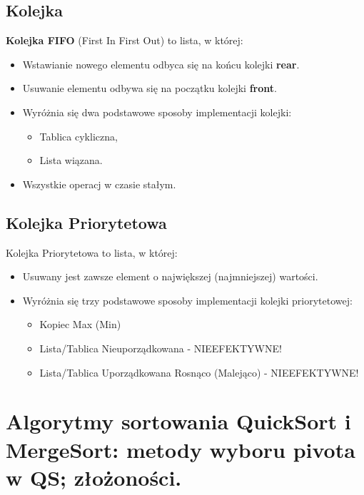 \documentclass[main.tex]{subfiles}
\begin{document}
    \subsection{Kolejka}
    \begin{definition}
        \textbf{Kolejka FIFO} (First In First Out) to lista, w której:
        \begin{itemize}[noitemsep]
            \item Wstawianie nowego elementu odbyca się na końcu kolejki \textbf{rear}.
            \item Usuwanie elementu odbywa się na początku kolejki \textbf{front}.
            \item Wyróżnia się dwa podstawowe sposoby implementacji kolejki:
            \begin{itemize}
                \item Tablica cykliczna,
                \item Lista wiązana.
            \end{itemize}
            \item Wszystkie operacj w czasie stałym.
        \end{itemize}
    \end{definition}


    \subsection{Kolejka Priorytetowa}
    \begin{definition}
        Kolejka Priorytetowa to lista, w której:
        \begin{itemize}
            \item Usuwany jest zawsze element o największej (najmniejszej) wartości.
            \item Wyróżnia się trzy podstawowe sposoby implementacji kolejki priorytetowej:
            \begin{itemize}
                \item Kopiec Max (Min)
                \item Lista/Tablica Nieuporządkowana - NIEEFEKTYWNE!
                \item Lista/Tablica Uporządkowana Rosnąco (Malejąco) - NIEEFEKTYWNE!
            \end{itemize}
        \end{itemize}
    \end{definition}


    \section{Algorytmy sortowania QuickSort i MergeSort: metody wyboru pivota w QS; złożoności.}
\end{document}
